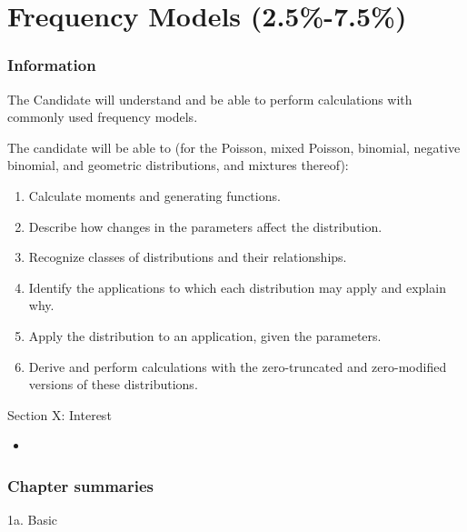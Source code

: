 \chapter[Frequency Models]{Frequency Models (2.5\%-7.5\%)}

\subsection{Information}

\begin{distributions}[Objective]
The Candidate will understand and be able to perform calculations with commonly used frequency models.
\end{distributions}

\begin{outcomes}
The candidate will be able to (for the Poisson, mixed Poisson, binomial, negative binomial, and geometric distributions, and mixtures thereof):
\begin{enumerate}[label = \alph*), leftmargin = *]
	\item	Calculate moments and generating functions.
	\item	Describe how changes in the parameters affect the distribution.
	\item	Recognize classes of distributions and their relationships.
	\item	Identify the applications to which each distribution may apply and explain why.
	\item	Apply the distribution to an application, given the parameters.
	\item	Derive and perform calculations with the zero-truncated and zero-modified versions of these distributions.
\end{enumerate}
\end{outcomes}

\begin{ASM_chapter}
Section X: Interest 
\begin{itemize}[leftmargin = *]
	\item	{}
\end{itemize}
\end{ASM_chapter}

\subsection{Chapter summaries}

\begin{CHPT_SUMM_AUTO}[label = {L.-1a}]{1a. Basic}

\end{CHPT_SUMM_AUTO}
